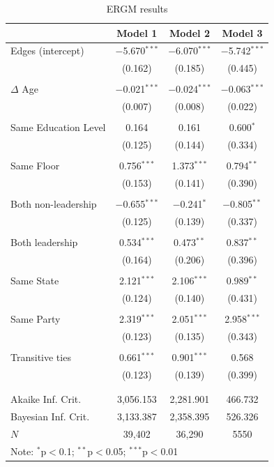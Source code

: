 \documentclass[fleqn,12pt]{wlscirep}
\begin{document}
\begin{table}
\begin{center}
\begin{tabular}{l c c c }
\hline
 & Model 1 & Model 2 & Model 3 \\
\hline
Edges (intercept)   & $-$5.670$^{***}$ & $-$6.070$^{***}$ & $-$5.742$^{***}$ \\ 
  & (0.162) & (0.185) & (0.445) \\ 
  & & & \\ 
$\Delta$ Age & $-$0.021$^{***}$ & $-$0.024$^{***}$ & $-$0.063$^{***}$ \\ 
  & (0.007) & (0.008) & (0.022) \\ 
  & & & \\ 
Same Education Level & 0.164 & 0.161 & 0.600$^{*}$ \\ 
  & (0.125) & (0.144) & (0.334) \\ 
  & & & \\ 
Same Floor & 0.756$^{***}$ & 1.373$^{***}$ & 0.794$^{**}$ \\ 
  & (0.153) & (0.141) & (0.390) \\ 
  & & & \\ 
Both non-leadership & $-$0.655$^{***}$ & $-$0.241$^{*}$ & $-$0.805$^{**}$ \\ 
  & (0.125) & (0.139) & (0.337) \\ 
  & & & \\ 
Both leadership & 0.534$^{***}$ & 0.473$^{**}$ & 0.837$^{**}$ \\ 
  & (0.164) & (0.206) & (0.396) \\ 
  & & & \\ 
Same State & 2.121$^{***}$ & 2.106$^{***}$ & 0.989$^{**}$ \\ 
  & (0.124) & (0.140) & (0.431) \\ 
  & & & \\ 
Same Party & 2.319$^{***}$ & 2.051$^{***}$ & 2.958$^{***}$ \\ 
  & (0.123) & (0.135) & (0.343) \\ 
  & & & \\ 
 Transitive ties & 0.661$^{***}$ & 0.901$^{***}$ & 0.568 \\ 
  & (0.123) & (0.139) & (0.399) \\ 
  & & & \\ 
\hline \\[-1.8ex] 
Akaike Inf. Crit. & 3,056.153 & 2,281.901 & 466.732 \\ 
Bayesian Inf. Crit. & 3,133.387 & 2,358.395 & 526.326 \\
$N$ & 39,402 & 36,290 & 5550 \\  
\hline
\multicolumn{4}{l}{\scriptsize{Note: {$^{*}$p$<$0.1; $^{**}$p$<$0.05; $^{***}$p$<$0.01}}}
\end{tabular}
\caption{ERGM results}
\label{table:coefficients}
\end{center}
\end{table}
\end{document}
